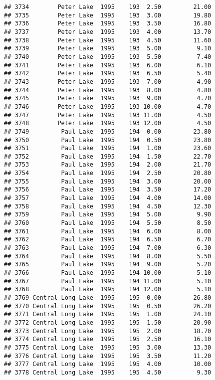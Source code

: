 \documentclass[
]{article}
\begin{document}
\begin{verbatim}
## 3734        Peter Lake  1995    193  2.50         21.00
## 3735        Peter Lake  1995    193  3.00         19.80
## 3736        Peter Lake  1995    193  3.50         16.80
## 3737        Peter Lake  1995    193  4.00         13.70
## 3738        Peter Lake  1995    193  4.50         11.60
## 3739        Peter Lake  1995    193  5.00          9.10
## 3740        Peter Lake  1995    193  5.50          7.40
## 3741        Peter Lake  1995    193  6.00          6.10
## 3742        Peter Lake  1995    193  6.50          5.40
## 3743        Peter Lake  1995    193  7.00          4.90
## 3744        Peter Lake  1995    193  8.00          4.80
## 3745        Peter Lake  1995    193  9.00          4.70
## 3746        Peter Lake  1995    193 10.00          4.70
## 3747        Peter Lake  1995    193 11.00          4.50
## 3748        Peter Lake  1995    193 12.00          4.50
## 3749         Paul Lake  1995    194  0.00         23.80
## 3750         Paul Lake  1995    194  0.50         23.80
## 3751         Paul Lake  1995    194  1.00         23.60
## 3752         Paul Lake  1995    194  1.50         22.70
## 3753         Paul Lake  1995    194  2.00         21.70
## 3754         Paul Lake  1995    194  2.50         20.80
## 3755         Paul Lake  1995    194  3.00         20.00
## 3756         Paul Lake  1995    194  3.50         17.20
## 3757         Paul Lake  1995    194  4.00         14.00
## 3758         Paul Lake  1995    194  4.50         12.30
## 3759         Paul Lake  1995    194  5.00          9.90
## 3760         Paul Lake  1995    194  5.50          8.50
## 3761         Paul Lake  1995    194  6.00          8.00
## 3762         Paul Lake  1995    194  6.50          6.70
## 3763         Paul Lake  1995    194  7.00          6.30
## 3764         Paul Lake  1995    194  8.00          5.50
## 3765         Paul Lake  1995    194  9.00          5.20
## 3766         Paul Lake  1995    194 10.00          5.10
## 3767         Paul Lake  1995    194 11.00          5.10
## 3768         Paul Lake  1995    194 12.00          5.10
## 3769 Central Long Lake  1995    195  0.00         26.80
## 3770 Central Long Lake  1995    195  0.50         26.20
## 3771 Central Long Lake  1995    195  1.00         24.10
## 3772 Central Long Lake  1995    195  1.50         20.90
## 3773 Central Long Lake  1995    195  2.00         18.70
## 3774 Central Long Lake  1995    195  2.50         16.10
## 3775 Central Long Lake  1995    195  3.00         13.30
## 3776 Central Long Lake  1995    195  3.50         11.20
## 3777 Central Long Lake  1995    195  4.00         10.00
## 3778 Central Long Lake  1995    195  4.50          9.30

\end{verbatim}
\end{document}
